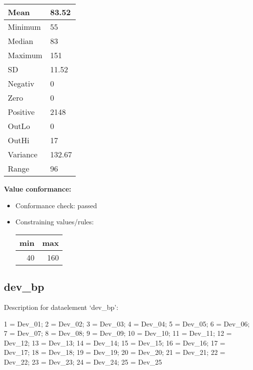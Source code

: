 \documentclass[
]{article}
\providecommand{\tightlist}{%
  \setlength{\itemsep}{0pt}\setlength{\parskip}{0pt}}
\begin{document}
\begin{table}[H]
\centering
\begin{tabular}{l|l}
\hline
Mean & 83.52\\
\hline
Minimum & 55\\
\hline
Median & 83\\
\hline
Maximum & 151\\
\hline
SD & 11.52\\
\hline
Negativ & 0\\
\hline
Zero & 0\\
\hline
Positive & 2148\\
\hline
OutLo & 0\\
\hline
OutHi & 17\\
\hline
Variance & 132.67\\
\hline
Range & 96\\
\hline
\end{tabular}
\end{table}

\textbf{Value conformance:}

\begin{itemize}
\tightlist
\item
  Conformance check: passed
\item
  Constraining values/rules:

  \begin{table}[H]
  \centering
  \begin{tabular}{r|r}
  \hline
  \textbf{min} & \textbf{max}\\
  \hline
  40 & 160\\
  \hline
  \end{tabular}
  \end{table}
\end{itemize}

\newpage

\hypertarget{dev_bp}{%
\subsection{dev\_bp}\label{dev_bp}}

Description for dataelement `dev\_bp':

1 = Dev\_01; 2 = Dev\_02; 3 = Dev\_03; 4 = Dev\_04; 5 = Dev\_05; 6 =
Dev\_06; 7 = Dev\_07; 8 = Dev\_08; 9 = Dev\_09; 10 = Dev\_10; 11 =
Dev\_11; 12 = Dev\_12; 13 = Dev\_13; 14 = Dev\_14; 15 = Dev\_15; 16 =
Dev\_16; 17 = Dev\_17; 18 = Dev\_18; 19 = Dev\_19; 20 = Dev\_20; 21 =
Dev\_21; 22 = Dev\_22; 23 = Dev\_23; 24 = Dev\_24; 25 = Dev\_25
\end{document}
